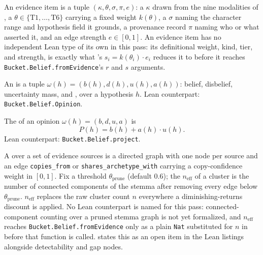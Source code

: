 \documentclass[11pt]{article}
\begin{document}
\begin{definition}
\label{def:evidence}
An evidence item is a tuple $(\kappa, \theta, \sigma, \pi, e)$: a
 $\kappa$ drawn from the nine modalities of
, a  $\theta \in
\{\mathrm{T1}, \ldots, \mathrm{T6}\}$ carrying a fixed weight
$k(\theta)$, a  $\sigma$ naming the character
range and hypothesis field it grounds, a provenance record $\pi$ naming
who or what asserted it, and an edge strength $e \in [0, 1]$. An evidence item has no independent Lean type of its own in this pass:
its definitional weight, kind, tier, and strength, is exactly what
's $s_i = k(\theta_i) \cdot e_i$ reduces it to
before it reaches \texttt{Bucket.Belief.fromEvidence}'s $r$ and $s$
arguments.
\end{definition}

\begin{definition}[Opinion]
\label{def:opinion}
An  is a tuple $\omega(h) = (b(h), d(h), u(h),
a(h))$: belief, disbelief, uncertainty mass, and , over a hypothesis $h$. Lean counterpart:
\texttt{Bucket.Belief.Opinion}.
\end{definition}

\begin{definition}
\label{def:projection}
The  of an opinion
$\omega(h) = (b, d, u, a)$ is
\begin{equation}
  \label{eq:projection}
  P(h) = b(h) + a(h) \cdot u(h).
\end{equation}
Lean counterpart: \texttt{Bucket.Belief.project}.
\end{definition}

\begin{definition}
\label{def:stemma}
A  over a set of evidence sources is a directed
graph with one node per source and an edge \texttt{copies\_from} or
\texttt{shares\_archetype\_with} carrying a copy-confidence weight in
$[0,1]$. Fix a threshold $\theta_{\mathrm{prune}}$ (default $0.6$); the
 $n_{\mathrm{eff}}$ of a cluster is
the number of connected components of the stemma after removing every
edge below $\theta_{\mathrm{prune}}$. $n_{\mathrm{eff}}$ replaces the raw
cluster count $n$ everywhere a diminishing-returns discount is applied.
No Lean counterpart is named for this pass: connected-component counting
over a pruned stemma graph is not yet formalized, and $n_{\mathrm{eff}}$
reaches \texttt{Bucket.Belief.fromEvidence} only as a plain \texttt{Nat}
substituted for $n$ in  before that function is
called.  states this as an open item in the Lean
listings alongside detectability and gap nodes.
\end{definition}
\end{document}
